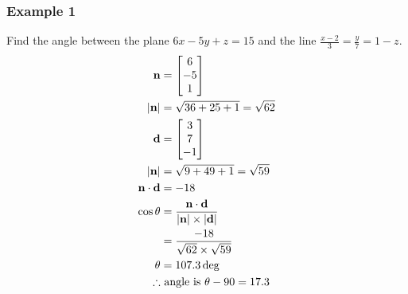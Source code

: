 \documentclass[a4paper,12pt]{article}
\begin{document}
\subsubsection*{Example 1}
Find the angle between the plane $6x -5y + z = 15$ and the line $\frac{x-2}{3} = \frac{y}{7} = 1-z$.
\begin{align*}
\bold{n} & = \begin{bmatrix} 6 \\ -5 \\ 1 \\ \end{bmatrix} \\
|\bold{n}| & = \sqrt{36 + 25 + 1} = \sqrt{62} \\
\bold{d} & = \begin{bmatrix} 3 \\ 7 \\ -1 \\ \end{bmatrix} \\
|\bold{n}| & = \sqrt{9 + 49 + 1} = \sqrt{59} \\
\bold{n} \cdot \bold{d} & = -18 \\
\cos \theta & = \frac{\bold{n} \cdot \bold{d}}{|\bold{n}| \times |\bold{d}|} \\
& = \frac{-18}{\sqrt{62} \times \sqrt{59}} \\
\theta & = 107.3 \deg \\
\therefore & \text{ angle is } \theta - 90 = 17.3 \\
\end{align*}
\end{document}
